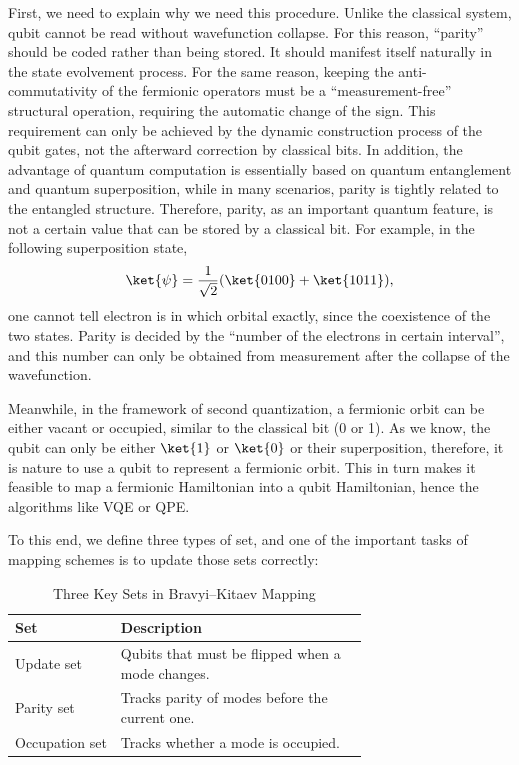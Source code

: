 First, we need to explain why we need this procedure. Unlike the classical system, qubit cannot be read without wavefunction collapse. For this reason, ``parity'' should be coded rather than being stored. It should manifest itself naturally in the state evolvement process. For the same reason, keeping the anti-commutativity of the fermionic operators must be a ``measurement-free'' structural operation, requiring the automatic change of the sign.  This requirement can only be achieved by the dynamic construction process of the qubit gates, not the afterward correction by classical bits. In addition, the advantage of quantum computation is essentially based on quantum entanglement and quantum superposition, while in many scenarios, parity is tightly related to the entangled structure. Therefore, parity, as an important quantum feature, is not a certain value that can be stored by a classical bit. For example, in the following superposition state,
\begin{equation}
    \ket{\psi}=\frac{1}{\sqrt{2}}(\ket{0100}+\ket{1011}),
\end{equation}
one cannot tell electron is in which orbital exactly, since the coexistence of the two states. Parity is decided by the ``number of the electrons in certain interval'', and this number can only be obtained from  measurement after the collapse of the wavefunction.

Meanwhile, in the framework of second quantization, a fermionic orbit can be either vacant or occupied, similar to the classical bit (0 or 1). As we know, the qubit can only be either $\ket{1}$ or $\ket{0}$ or their superposition, therefore, it is nature to use a qubit to represent a fermionic orbit. This in turn makes it feasible to map a fermionic Hamiltonian into a qubit Hamiltonian, hence the algorithms like VQE or QPE.

To this end, we define three types of set, and one of the important tasks of mapping schemes is to update those sets correctly:
\begin{table}[ht]
\centering
\caption{Three Key Sets in Bravyi--Kitaev Mapping}
\label{tab:bksets}
\begin{tabular}{|l|p{0.7\linewidth}|}
\hline
\textbf{Set} & \textbf{Description} \\
\hline
Update set & Qubits that must be flipped when a mode changes. \\
Parity set & Tracks parity of modes before the current one. \\
Occupation set & Tracks whether a mode is occupied. \\
\hline
\end{tabular}
\end{table}


